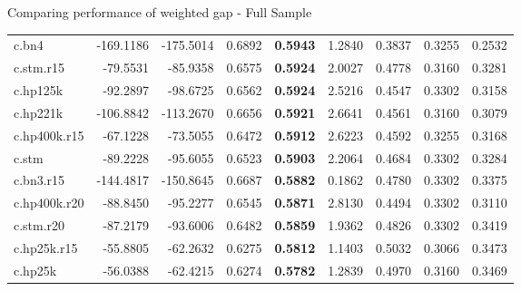 \documentclass[
  ignorenonframetext,
]{beamer}
\begin{document}
\begin{frame}{Comparing performance of weighted gap - Full Sample}
{\begin{tabular}[t]{lrrr>{}rrrrr}
\addlinespace
c.bn4 & -169.1186 & -175.5014 & 0.6892 & \textbf{0.5943} & 1.2840 & 0.3837 & 0.3255 & 0.2532\\
c.stm.r15 & -79.5531 & -85.9358 & 0.6575 & \textbf{0.5924} & 2.0027 & 0.4778 & 0.3160 & 0.3281\\
c.hp125k & -92.2897 & -98.6725 & 0.6562 & \textbf{0.5924} & 2.5216 & 0.4547 & 0.3302 & 0.3158\\
c.hp221k & -106.8842 & -113.2670 & 0.6656 & \textbf{0.5921} & 2.6641 & 0.4561 & 0.3160 & 0.3079\\
c.hp400k.r15 & -67.1228 & -73.5055 & 0.6472 & \textbf{0.5912} & 2.6223 & 0.4592 & 0.3255 & 0.3168\\
\addlinespace
c.stm & -89.2228 & -95.6055 & 0.6523 & \textbf{0.5903} & 2.2064 & 0.4684 & 0.3302 & 0.3284\\
c.bn3.r15 & -144.4817 & -150.8645 & 0.6687 & \textbf{0.5882} & 0.1862 & 0.4780 & 0.3302 & 0.3375\\
c.hp400k.r20 & -88.8450 & -95.2277 & 0.6545 & \textbf{0.5871} & 2.8130 & 0.4494 & 0.3302 & 0.3110\\
c.stm.r20 & -87.2179 & -93.6006 & 0.6482 & \textbf{0.5859} & 1.9362 & 0.4826 & 0.3302 & 0.3419\\
c.hp25k.r15 & -55.8805 & -62.2632 & 0.6275 & \textbf{0.5812} & 1.1403 & 0.5032 & 0.3066 & 0.3473\\
\addlinespace
c.hp25k & -56.0388 & -62.4215 & 0.6274 & \textbf{0.5782} & 1.2839 & 0.4970 & 0.3160 & 0.3469\\
\bottomrule
\end{tabular}}
\end{frame}
\end{document}
